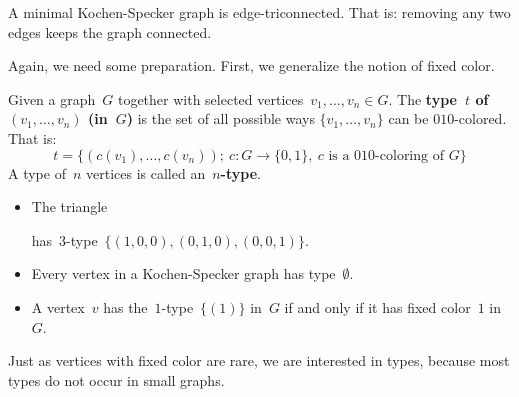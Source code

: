 \documentclass{report}
\newcommand{\keyword}[1]{\textbf{#1}}
\begin{document}
\begin{proposition}\label{prop:ks-triconn}
    A minimal Kochen-Specker graph is edge-triconnected.
    That is: removing any two edges keeps the graph connected.
\end{proposition}
Again, we need some preparation.  First, we generalize
the notion of fixed color.
\begin{definition}
   Given a graph~$G$ together with selected vertices~$v_1, \ldots, v_n \in G$.
   The \keyword{type~$t$ of~$(v_1,\ldots,v_n)$ (in~$G$)}
   is the set of all possible ways $\{v_1, \ldots, v_n\}$ can be $010$-colored.
        That is:
\begin{equation*}
  t = \bigl\{ (c(v_1), \ldots, c(v_n)); \ 
        c \colon G \to \{0,1\},\ 
        \text{$c$ is a $010$-coloring of~$G$} \bigr\}
\end{equation*}
    A type of~$n$ vertices is
    called an~\keyword{$n$-type}.
\end{definition}

\begin{example}
\begin{itemize}
\item The triangle~
has~$3$-type~$\{(1,0,0), (0,1,0), (0,0,1)\}$.
\item Every vertex in a Kochen-Specker graph has type~$\emptyset$.
\item
    A vertex~$v$ has the~$1$-type~$\{(1)\}$ in~$G$ if and only if
        it has fixed color~$1$ in~$G$.
\end{itemize}
\end{example}

Just as vertices with fixed color are rare,
we are interested in types,
because most types do not occur in small graphs.
\end{document}
